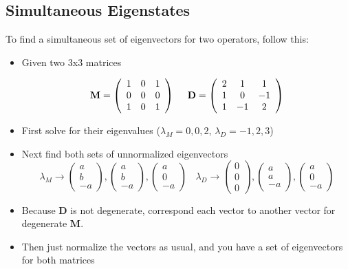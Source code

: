 \subsection{Simultaneous Eigenstates}
To find a simultaneous set of eigenvectors for two operators, follow this:
\begin{itemize}
\item Given two 3x3 matrices

$$\bf{M} = 
\left(
{\begin{array}{ccc}
1&0&1\\
0&0&0\\
1&0&1\\
\end{array}}
\right)
~~~~\bf{D} = 
\left(
{\begin{array}{ccc}
2&1&1\\
1&0&-1\\
1&-1&2\\
\end{array}}
\right)$$

\item First solve for their eigenvalues ($\lambda_M = 0,0,2$, $\lambda_D = -1,2,3$)
\item Next find both sets of unnormalized eigenvectors
$$
\lambda_M\rightarrow  
\left(
{\begin{array}{c}
a\\
b\\
-a
\end{array}}
\right),
\left(
{\begin{array}{c}
a\\
b\\
-a
\end{array}}
\right),
\left(
{\begin{array}{c}
a\\
0\\
-a
\end{array}}
\right)~~~~
\lambda_D\rightarrow
\left(
{\begin{array}{c}
0\\
0\\
0
\end{array}}
\right),\left(
{\begin{array}{c}
a\\
a\\
-a
\end{array}}
\right),
\left(
{\begin{array}{c}
a\\
0\\
-a
\end{array}}
\right)$$
\item Because $\textbf{D}$ is not degenerate, correspond each vector to another vector for degenerate $\textbf{M}$. 
\item Then just normalize the vectors as usual, and you have a set of eigenvectors for both matrices
\end{itemize}


